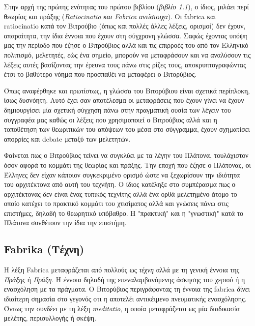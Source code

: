 Στην αρχή της πρώτης ενότητας του πρώτου βιβλίου (\emph{βιβλίο 1.1}), ο ίδιος, μιλάει περί θεωρίας και πράξης (\emph{Ratiocinatio και Fabrica αντίστοιχα}). \cite[σ. 37]{vitruvius-lefas} Οι fabrica και ratiocinatio κατά τον Βιτρούβιο (όπως και πολλές άλλες λέξεις, ορισμοί) δεν έχουν, απαραίτητα, την ίδια έννοια που έχουν στη σύγχρονη γλώσσα. Σαφώς έχοντας υπόψη μας την περίοδο που έζησε ο Βιτρούβιος αλλά και τις επιρροές του από τον Ελληνικό πολιτισμό, μελετητές, εώς ένα σημείο, μπορούν να μεταφράσουν και να αναλύσουν τις λέξεις αυτές βασίζοντας την έρευνα τους πάνω στις ρίζες τους, αποκρυπτογραφώντας έτσι το βαθύτερο νόημα που προσπαθέι να μεταφέρει ο Βιτορύβιος.\cite{graham-education} 

Όπως αναφέρθηκε και πρωτίστως, η γλώσσα του Βιτορύβιου είναι σχετικά περίπλοκη, ίσως δυσνόητη. Αυτό έχει σαν αποτέλεσμα οι μεταφράσεις που έχουν γίνει να έχουν δημιουργίσει μία σχετική σύγχηση πάνω στην πραγματική ουσία των λέγειν του συγγραφέα μας καθώς οι λέξεις που χρησιμοποιεί ο Βιτρούβιος αλλά και η τοποθέτηση των θεωριτικών του απόψεων του μέσα στο σύγγραμμα, έχουν σχηματίσει απορρίες και debate μεταξύ των μελετητών.

Φαίνεται πως ο Βιτρούβιος τείνει να συγκλύει με τα λέγην του Πλάτονα, τουλάχιστον όσον αφορά το κομμάτι της θεωρίας και πράξης. Την εποχή που έζησε ο Πλάτονας, οι Έλληνες δεν είχαν κάποιον συγκεκριμένο ορισμό ώστε να ξεχωρίσουν την ιδιότητα του αρχιτέκτονα από αυτή του τεχνήτη. Ο ίδιος κατέληξε στο συμπέρασμα πως ο αρχιτέκτονας δεν είναι ένας τυπικός τεχνίτης αλλά ένα ορθά μελετημένο άτομο το οποίο κατέχει το πρακτικό κομμάτι του χτισίματος αλλά και γνώσεις πάνω στις επιστήμες, δηλαδή το θεωρητικό υπόβαθρο. Η "πρακτική" και η "γνωστική" κατά το Πλάτονα συνθέτουν την ίδια την επιστήμη. \cite{graham-education}

\subsection{Fabrika (Τέχνη)}

Η λέξη Fabrica μεταφράζεται από πολλούς ως \emph{τέχνη} αλλά με τη γενική έννοια της \emph{Πράξης} ή \emph{Πράξη}. \cite[σ. 85]{vitruvius-lefas,graham-education} Η έννοια δηλαδή της επεναλαμβανόμενης άσκησης του χεριού ή η ενασχόληση με τα πράγματα. Ο Βιτορύβιος περιγράφοντας τη έννοια της fabrica δίνει ιδιαίτερη σημασία στο γεγονός οτι η αποτελέι αντικέιμενο πνευματικής ενασχόλησης. Όντως την συνδέει με τη λέξη \emph{meditatio}, η οποία μεταφράζεται ως μία διαδικασία μελέτης, περισυλλογής ή σκέψη. 



